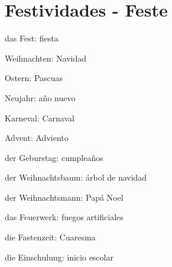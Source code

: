 \section{Festividades - Feste}
\begin{multicols}{2}
\begin{myitemize}
\item das Fest: fiesta
\item Weihnachten: Navidad
\item Ostern: Pascuas
\item Neujahr: año nuevo
\item Karneval: Carnaval
\item Advent: Adviento
\item der Geburstag: cumpleaños
\item der Weihnachtsbaum: árbol de navidad
\item der Weihnachtsmann: Papá Noel
\item das Feuerwerk: fuegos artificiales
\item die Fastenzeit: Cuaresma
\item die Einschulung: inicio escolar
\end{myitemize}
\end{multicols}

